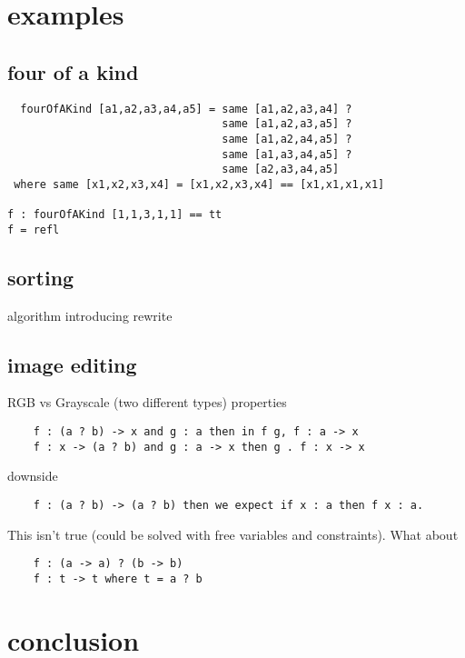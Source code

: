 \documentclass{article}
\begin{document}
\section{examples}
\subsection{four of a kind}
\begin{verbatim}
  fourOfAKind [a1,a2,a3,a4,a5] = same [a1,a2,a3,a4] ? 
                                 same [a1,a2,a3,a5] ? 
                                 same [a1,a2,a4,a5] ? 
                                 same [a1,a3,a4,a5] ? 
                                 same [a2,a3,a4,a5]
 where same [x1,x2,x3,x4] = [x1,x2,x3,x4] == [x1,x1,x1,x1]

f : fourOfAKind [1,1,3,1,1] == tt
f = refl
\end{verbatim}

\subsection{sorting}
  algorithm
  introducing rewrite

\subsection{image editing}
  RGB vs Grayscale (two different types)
  properties
\begin{verbatim}
    f : (a ? b) -> x and g : a then in f g, f : a -> x
    f : x -> (a ? b) and g : a -> x then g . f : x -> x
\end{verbatim}
  downside
\begin{verbatim}
    f : (a ? b) -> (a ? b) then we expect if x : a then f x : a.
\end{verbatim}
This isn't true (could be solved with free variables and constraints).
What about
\begin{verbatim}
    f : (a -> a) ? (b -> b)
    f : t -> t where t = a ? b
\end{verbatim}
  


\section{conclusion}
\end{document}
